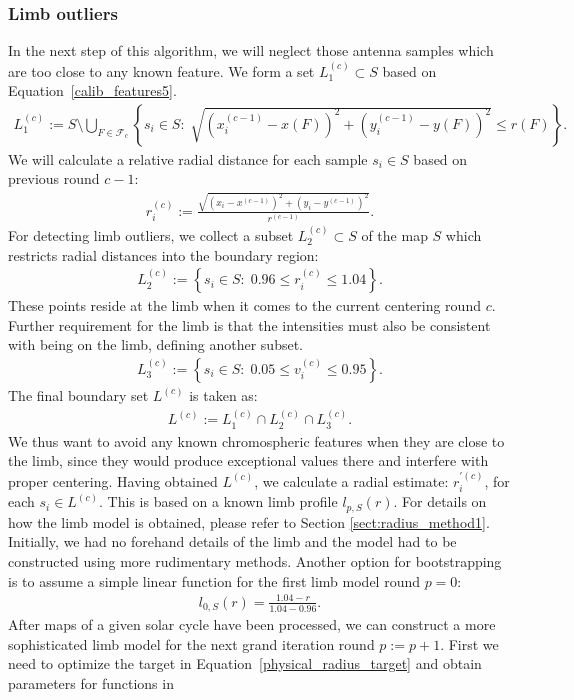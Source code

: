 \documentclass{aa}
\newcommand{\eqnl}[2]{\begin{eqnarray}\label{#1}#2\end{eqnarray}}
\begin{document}
  \subsubsection{Limb outliers} \label{sect:outliers_limb}

  In the next step of this algorithm, we will neglect those antenna samples which are too close to any known feature. We form a set $L^{(c)}_1 \subset S$ based on Equation~\ref{calib_features5}.
  \eqnl{calib_features6}{
  L^{(c)}_1 := S \setminus \bigcup \limits_{F \in \mathcal{F}_c} \left\{ s_i \in S: \; \sqrt{\left( x^{(c-1)}_i - x(F) \right)^2 + \left( y^{(c-1)}_i - y(F) \right)^2} \le r(F) \right\} \text{.}
  }
  We will calculate a relative radial distance for each sample $s_i \in S$ based on previous round $c-1$:
  \eqnl{calib_radial_distance}{
  r_i^{(c)} := \frac{\sqrt{\left( x_i - x^{(c-1)} \right)^2 + \left( y_i - y^{(c-1)} \right)^2}}{r^{(c-1)}} \text{.}
  }
  For detecting limb outliers, we collect a subset $L^{(c)}_2 \subset S$ of the map $S$ which restricts radial distances into the boundary region:
  \eqnl{calib_subset1}{
  L^{(c)}_2 := \left\{ s_i \in S:\; 0.96 \le r_i^{(c)} \le 1.04 \right\} \text{.}
  }
  These points reside at the limb when it comes to the current centering round $c$. Further requirement for the limb is that the intensities must also be consistent with being on the limb, defining another subset.
  \eqnl{calib_subset2}{
  L^{(c)}_3 := \left\{ s_i \in S:\; 0.05 \le v_i^{(c)} \le 0.95 \right\} \text{.}
  }
  The final boundary set $L^{(c)}$ is taken as:
  \eqnl{calib_subset3}{
  L^{(c)} := L^{(c)}_1 \cap L^{(c)}_2 \cap L^{(c)}_3 \text{.}
  }
  We thus want to avoid any known chromospheric features when they are close to the limb, since they would produce 
  exceptional values there and interfere with proper centering. Having obtained $L^{(c)}$, we calculate a radial 
  estimate: $r_i^{\prime(c)}$, for each $s_i \in L^{(c)}$. This is based on a known limb profile $l_{p,S}(r)$. For details on how the 
  limb model is obtained, please refer to Section \ref{sect:radius_method1}. Initially, we had no forehand details of 
  the limb and the model had to be constructed using more rudimentary methods. Another option for bootstrapping is to assume a simple linear function for the first limb model round $p=0$:
  \eqnl{calib_limbmodel1}{
  l_{0,S}(r) = \frac{1.04 - r}{1.04 - 0.96} \text{.}
  }
  After maps of a given solar cycle have been processed, we can construct a more sophisticated limb model for the next grand iteration round $p := p+1$. First we need 
  to optimize the target in Equation~\ref{physical_radius_target} and obtain parameters for functions in 
\end{document}
